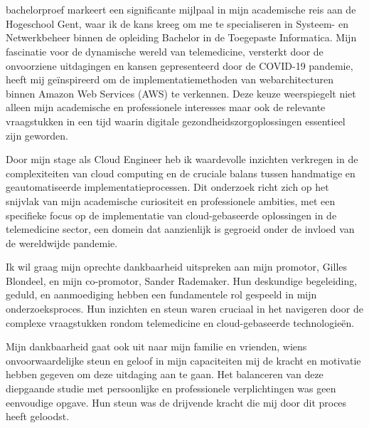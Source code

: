 
\chapter*{}%
\label{ch:voorwoord}



 bachelorproef markeert een significante mijlpaal in mijn academische reis aan de Hogeschool Gent, waar ik de kans kreeg om me te specialiseren in Systeem- en Netwerkbeheer binnen de opleiding Bachelor in de Toegepaste Informatica. Mijn fascinatie voor de dynamische wereld van telemedicine, versterkt door de onvoorziene uitdagingen en kansen gepresenteerd door de COVID-19 pandemie, heeft mij geïnspireerd om de implementatiemethoden van webarchitecturen binnen Amazon Web Services (AWS) te verkennen. Deze keuze weerspiegelt niet alleen mijn academische en professionele interesses maar ook de relevante vraagstukken in een tijd waarin digitale gezondheidszorgoplossingen essentieel zijn geworden.

Door mijn stage als Cloud Engineer heb ik waardevolle inzichten verkregen in de complexiteiten van cloud computing en de cruciale balans tussen handmatige en geautomatiseerde implementatieprocessen. Dit onderzoek richt zich op het snijvlak van mijn academische curiositeit en professionele ambities, met een specifieke focus op de implementatie van cloud-gebaseerde oplossingen in de telemedicine sector, een domein dat aanzienlijk is gegroeid onder de invloed van de wereldwijde pandemie.

Ik wil graag mijn oprechte dankbaarheid uitspreken aan mijn promotor, Gilles Blondeel, en mijn co-promotor, Sander Rademaker. Hun deskundige begeleiding, geduld, en aanmoediging hebben een fundamentele rol gespeeld in mijn onderzoeksproces. Hun inzichten en steun waren cruciaal in het navigeren door de complexe vraagstukken rondom telemedicine en cloud-gebaseerde technologieën.

Mijn dankbaarheid gaat ook uit naar mijn familie en vrienden, wiens onvoorwaardelijke steun en geloof in mijn capaciteiten mij de kracht en motivatie hebben gegeven om deze uitdaging aan te gaan. Het balanceren van deze diepgaande studie met persoonlijke en professionele verplichtingen was geen eenvoudige opgave. Hun steun was de drijvende kracht die mij door dit proces heeft geloodst.

